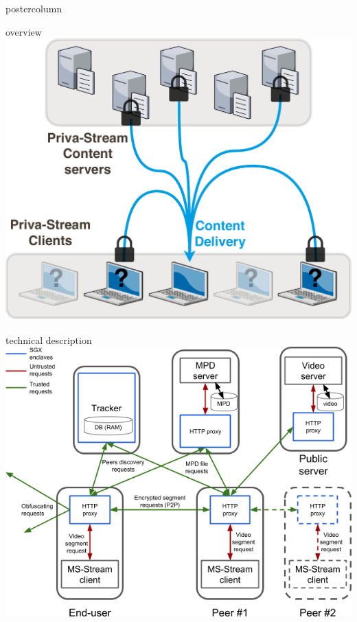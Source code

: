 \begin{frame}
\begin{columns}
\begin{column}{.49\textwidth}
\begin{beamercolorbox}[center,wd=\textwidth]{postercolumn}
\begin{minipage}[T]{.95\textwidth}
{            \begin{block}{\pname overview}
            \centering
            \includegraphics[width=.925\textwidth]{sample/BP.pdf}
            \end{block}
            
            
            \begin{block}{\pname technical description}
            \centering
            \includegraphics[width=.8\textwidth]{sample/PS-tech.png}
            \end{block}
            
}
\end{minipage}
\end{beamercolorbox}
\end{column}
\end{columns}
\end{frame}

